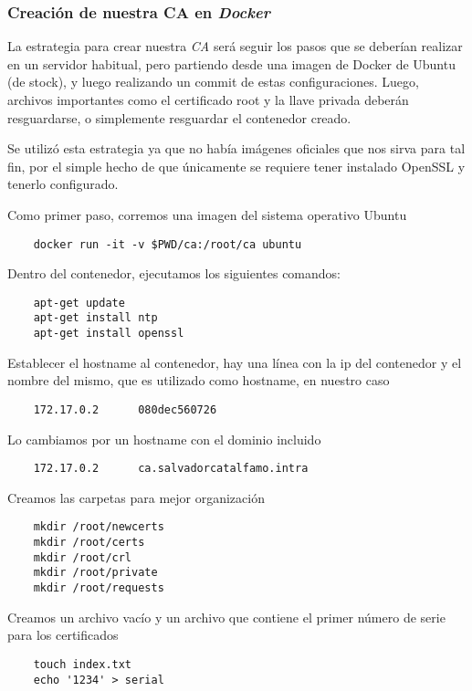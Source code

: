 \subsubsection*{Creación de nuestra CA en \emph{Docker}}

La estrategia para crear nuestra \emph{CA} será seguir los pasos que se deberían realizar en un servidor 
habitual, pero partiendo desde una imagen de Docker de Ubuntu (de stock), y luego realizando un 
commit de estas configuraciones. Luego, archivos importantes como el certificado root y la llave
privada deberán resguardarse, o simplemente resguardar el contenedor creado. 

Se utilizó esta estrategia ya que no había imágenes oficiales que nos sirva para tal fin, por el 
simple hecho de que únicamente se requiere tener instalado OpenSSL y tenerlo configurado.

\noindent Como primer paso, corremos una imagen del sistema operativo Ubuntu

\begin{verbatim}
    docker run -it -v $PWD/ca:/root/ca ubuntu
\end{verbatim}

\noindent Dentro del contenedor, ejecutamos los siguientes comandos:
\begin{verbatim}
    apt-get update
    apt-get install ntp
    apt-get install openssl
\end{verbatim}

\noindent Establecer el hostname al contenedor, hay una línea con la ip del contenedor y el nombre del mismo, 
que es utilizado como hostname, en nuestro caso
\begin{verbatim}
    172.17.0.2      080dec560726
\end{verbatim}

\noindent Lo cambiamos por un hostname con el dominio incluido
\begin{verbatim}
    172.17.0.2      ca.salvadorcatalfamo.intra
\end{verbatim}

\noindent Creamos las carpetas para mejor organización
\begin{verbatim}
    mkdir /root/newcerts
    mkdir /root/certs
    mkdir /root/crl
    mkdir /root/private
    mkdir /root/requests
\end{verbatim}

\noindent Creamos un archivo vacío y un archivo que contiene el primer número de serie para los certificados 
\begin{verbatim}
    touch index.txt
    echo '1234' > serial
\end{verbatim}

